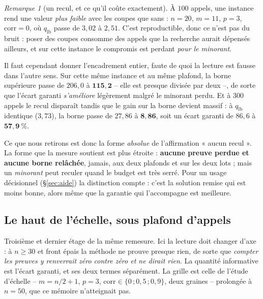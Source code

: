 \documentclass[11pt,a4paper]{article}
\theoremstyle{plain}
\theoremstyle{remark}
\newtheorem{remark}{Remarque}
\begin{document}
\begin{remark}[un recul, et ce qu'il coûte exactement]
\label{rem:recullot}
À $100$ appels, une instance rend une valeur \emph{plus faible} avec les
coupes que sans : $n=20$, $m=11$, $p=3$, $\text{corr}=0$, où
$q_{\text{lb}}$ passe de $3{,}02$ à $2{,}51$. C'est reproductible, donc ce
n'est pas du bruit : poser des coupes consomme des appels que la recherche
aurait dépensés ailleurs, et sur cette instance le compromis est perdant
\emph{pour le minorant}.

Il faut cependant donner l'encadrement entier, faute de quoi la lecture est
fausse dans l'autre sens. Sur cette même instance et au même plafond, la
borne supérieure passe de $206{,}0$ à $\mathbf{115{,}2}$ -- elle est presque
divisée par deux --, de sorte que l'écart garanti \emph{s'améliore}
légèrement malgré le minorant perdu. Et à $300$ appels le recul disparaît
tandis que le gain sur la borne devient massif : à $q_{\text{lb}}$
identique ($3{,}73$), la borne passe de $27{,}86$ à $\mathbf{8{,}86}$, soit
un écart garanti de $86{,}6$ à $\mathbf{57{,}9\ \%}$.

Ce que nous retirons est donc la forme \emph{absolue} de l'affirmation
« aucun recul ». La forme que la mesure soutient est plus étroite :
\textbf{aucune preuve perdue et aucune borne relâchée}, jamais, aux deux
plafonds et sur les deux lots ; mais un \emph{minorant} peut reculer quand
le budget est très serré. Pour un usage décisionnel (§\ref{sec:aide}) la
distinction compte : c'est la solution remise qui est moins bonne, alors
même que la garantie qui l'accompagne est meilleure.
\end{remark}

\subsection{Le haut de l'échelle, sous plafond d'appels}
\label{sec:echelledeterm}

Troisième et dernier étage de la même remesure. Ici la lecture doit changer
d'axe : à $n\ge 30$ et front épais la méthode ne prouve presque rien, de
sorte que \emph{compter les preuves y renverrait zéro contre zéro et ne
dirait rien}. La quantité informative est l'écart garanti, et ses deux
termes séparément. La grille est celle de l'étude d'échelle -- $m=n/2+1$,
$p=3$, $\text{corr}\in\{0\,;0{,}5\,;0{,}9\}$, deux graines -- prolongée à
$n=50$, que ce mémoire n'atteignait pas.
\end{document}
